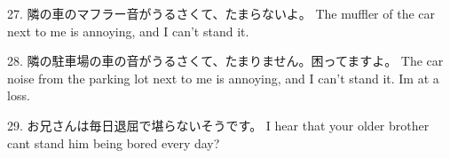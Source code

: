 \par{27. 隣の車のマフラー音がうるさくて、たまらないよ。 \hfill\break
The muffler of the car next to me is annoying, and I can't stand it. }

\par{28. 隣の駐車場の車の音がうるさくて、たまりません。困ってますよ。 \hfill\break
The car noise from the parking lot next to me is annoying, and I can't stand it. I\textquotesingle m at a loss. }

\par{29. お兄さんは毎日退屈で堪らないそうです。 \hfill\break
I hear that your older brother can\textquotesingle t stand him being bored every day? }
    